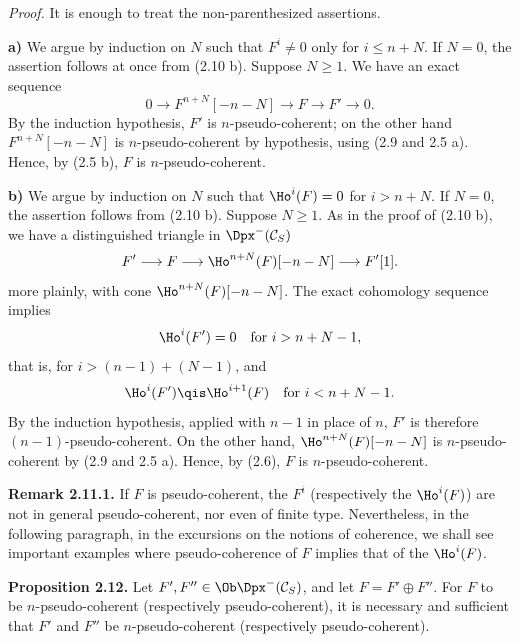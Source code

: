 \documentclass[11pt]{article}
\begin{document}
\emph{Proof.} It is enough to treat the non-parenthesized assertions.

\textbf{a)} We argue by induction on \(N\) such that \(F^i\neq0\) only for \(i\leq n+N\). If \(N=0\), the assertion follows at once from (2.10 b). Suppose \(N\geq1\). We have an exact sequence
\[
  0\longrightarrow F^{n+N}[-n-N]\longrightarrow F\longrightarrow F'\longrightarrow 0 .
\]
By the induction hypothesis, \(F'\) is \(n\)-pseudo-coherent; on the other hand \(F^{n+N}[-n-N]\) is \(n\)-pseudo-coherent by hypothesis, using (2.9 and 2.5 a). Hence, by (2.5 b), \(F\) is \(n\)-pseudo-coherent.

\textbf{b)} We argue by induction on \(N\) such that \(\Ho^i(F)=0\) for \(i>n+N\). If \(N=0\), the assertion follows from (2.10 b). Suppose \(N\geq1\). As in the proof of (2.10 b), we have a distinguished triangle in \(\Dpx^-(\mathcal C_S)\)
\[
  F'\longrightarrow F\longrightarrow \Ho^{n+N}(F)[-n-N]\longrightarrow F'[1].
\]
more plainly, with cone \(\Ho^{n+N}(F)[-n-N]\). The exact cohomology sequence implies
\[
  \Ho^i(F')=0\quad\text{for } i>n+N-1,
\]
that is, for \(i>(n-1)+(N-1)\), and
\[
  \Ho^i(F')\qis \Ho^{i+1}(F)\quad\text{for }i<n+N-1 .
\]
By the induction hypothesis, applied with \(n-1\) in place of \(n\), \(F'\) is therefore \((n-1)\)-pseudo-coherent. On the other hand, \(\Ho^{n+N}(F)[-n-N]\) is \(n\)-pseudo-coherent by (2.9 and 2.5 a). Hence, by (2.6), \(F\) is \(n\)-pseudo-coherent.

\textbf{Remark 2.11.1.} If \(F\) is pseudo-coherent, the \(F^i\) (respectively the \(\Ho^i(F)\)) are not in general pseudo-coherent, nor even of finite type. Nevertheless, in the following paragraph, in the excursions on the notions of coherence, we shall see important examples where pseudo-coherence of \(F\) implies that of the \(\Ho^i(F)\).

\textbf{Proposition 2.12.} Let \(F',F''\in\Ob\Dpx^-(\mathcal C_S)\), and let \(F=F'\oplus F''\). For \(F\) to be \(n\)-pseudo-coherent (respectively pseudo-coherent), it is necessary and sufficient that \(F'
\) and \(F''\) be \(n\)-pseudo-coherent (respectively pseudo-coherent).
\end{document}
